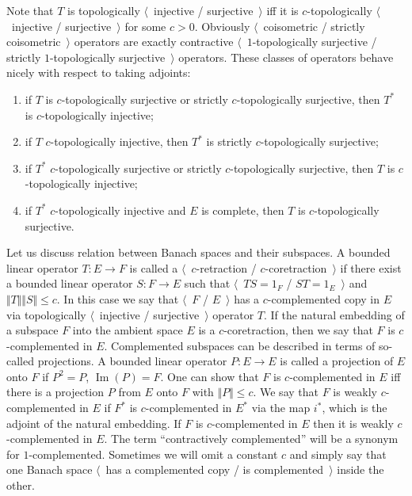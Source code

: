 Note that $T$ is topologically $\langle$~injective / surjective~$\rangle$ iff it
is $c$-topologically $\langle$~injective / surjective~$\rangle$ for some $c>0$.
Obviously $\langle$~coisometric / strictly coisometric~$\rangle$ operators are
exactly contractive $\langle$~$1$-topologically surjective / strictly
$1$-topologically surjective~$\rangle$ operators. These classes of operators 
behave nicely with respect to taking adjoints:

\begin{enumerate}[label = (\roman*)]
  \item if $ T$ is $c$-topologically surjective or strictly $c$-topologically 
  surjective, then $ T^*$ is $c$-topologically injective;

  \item if $ T$ $c$-topologically injective, then $ T^*$ is strictly
  $c$-topologically surjective;

  \item if $ T^*$ $c$-topologically surjective or strictly $c$-topologically 
  surjective, then $ T$ is $c$-topologically injective;

  \item if $T^*$ $c$-topologically injective and $E$ is complete, then $T$ 
  is $c$-topologically surjective.
\end{enumerate}

Let us discuss relation between Banach spaces and their subspaces. A bounded 
linear operator $T:E\to F$ is called a $\langle$~$c$-retraction /
$c$-coretraction~$\rangle$ if there exist a bounded linear operator $S:F\to E$
such that $\langle$~$T S=1_F$ / $S T=1_E$~$\rangle$ 
and $\Vert T\Vert\Vert S\Vert\leq c$. In this case we say 
that $\langle$~$F$ / $E$~$\rangle$ has a
$c$-complemented copy in $E$ via topologically $\langle$~injective /
surjective~$\rangle$ operator $T$. If the natural embedding of a subspace $F$
into the ambient space $E$ is a $c$-coretraction, then we say that $F$ is
$c$-complemented in $E$. Complemented subspaces can be described in terms of so-called 
projections. A bounded linear operator $P:E\to E$ is called a projection 
of $E$ onto $F$ if $P^2=P$, $\operatorname{Im}(P)=F$. One can show that 
$F$ is $c$-complemented in $E$ iff there is a projection $P$ from $E$ onto $F$ 
with $\Vert P\Vert\leq c$. We say that $F$ is weakly $c$-complemented in $E$
if $F^*$ is $c$-complemented in $E^*$ via the map $i^*$, which is the adjoint of
the natural embedding. If $F$ is $c$-complemented in $E$ then it is 
weakly $c$-complemented in $E$.  The term ``contractively complemented'' will 
be a synonym for $1$-complemented. Sometimes we will omit a constant $c$ and 
simply say that one Banach space $\langle$~has a complemented copy / 
is complemented~$\rangle$ inside the other. 

